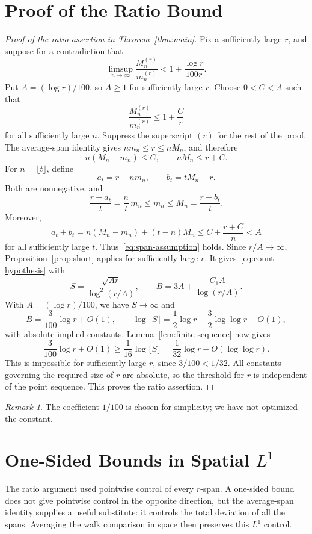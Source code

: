 \documentclass[11pt]{article}
\theoremstyle{remark}
\newtheorem{remark}[theorem]{Remark}
\numberwithin{equation}{section}
\begin{document}
\section{Proof of the Ratio Bound}\label{sec:ratio-proof}
\begin{proof}[Proof of the ratio assertion in Theorem~\ref{thm:main}]
Fix a sufficiently large $r$, and suppose for a contradiction that
\[
  \limsup_{n\to\infty}\frac{M_n^{(r)}}{m_n^{(r)}}
  <1+\frac{\log r}{100r}.
\]
Put $A=(\log r)/100$, so $A\geq1$ for sufficiently large $r$.
Choose $0<C<A$ such that
\[
  \frac{M_n^{(r)}}{m_n^{(r)}}\leq1+\frac Cr
\]
for all sufficiently large $n$. Suppress the superscript $(r)$ for the
rest of the proof. The average-span identity gives $nm_n\leq r\leq nM_n$,
and therefore
\[
  n(M_n-m_n)\leq C,
  \qquad
  nM_n\leq r+C.
\]
For $n=\lfloor t\rfloor$, define
\[
  a_t=r-nm_n,
  \qquad
  b_t=tM_n-r.
\]
Both are nonnegative, and
\[
  \frac{r-a_t}{t}=\frac nt\,m_n\leq m_n
  \leq M_n=\frac{r+b_t}{t}.
\]
Moreover,
\[
  a_t+b_t
  =n(M_n-m_n)+(t-n)M_n
  \leq C+\frac{r+C}{n}<A
\]
for all sufficiently large $t$. Thus~\eqref{eq:span-assumption} holds.
Since $r/A\to\infty$, Proposition~\ref{prop:short} applies for sufficiently
large $r$. It gives~\eqref{eq:count-hypothesis} with
\[
  S=\frac{\sqrt{Ar}}{\log^2(r/A)},
  \qquad
  B=3A+\frac{C_1A}{\log(r/A)}.
\]
With $A=(\log r)/100$, we have $S\to\infty$ and
\[
  B=\frac3{100}\log r+O(1),
  \qquad
  \log\lfloor S\rfloor
  =\frac12\log r-\frac32\log\log r+O(1),
\]
with absolute implied constants. Lemma~\ref{lem:finite-sequence} now gives
\[
  \frac3{100}\log r+O(1)
  \geq\frac1{16}\log\lfloor S\rfloor
  =\frac1{32}\log r-O(\log\log r).
\]
This is impossible for sufficiently large $r$, since $3/100<1/32$.
All constants governing the required size of $r$ are absolute, so the
threshold for $r$ is independent of the point sequence. This proves the
ratio assertion.
\end{proof}
\begin{remark}
The coefficient $1/100$ is chosen for simplicity; we have not optimized
the constant.
\end{remark}
\section{One-Sided Bounds in Spatial \texorpdfstring{$L^1$}{L1}}
The ratio argument used pointwise control of every $r$-span. A one-sided
bound does not give pointwise control in the opposite direction, but the
average-span identity supplies a useful substitute: it controls the total
deviation of all the spans. Averaging the walk comparison in space then
preserves this $L^1$ control.
\end{document}

